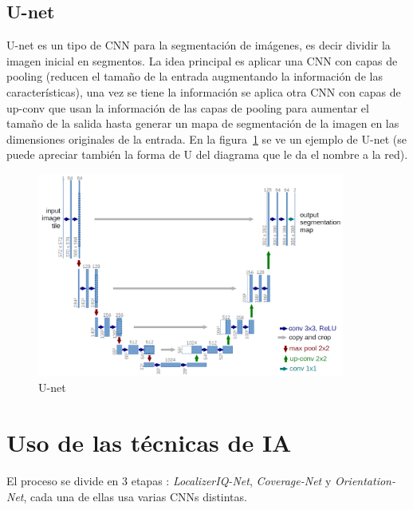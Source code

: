     
    \subsection{U-net}
    
    U-net es un tipo de CNN para la segmentación de imágenes, es decir dividir la imagen inicial en
    segmentos. La idea principal es aplicar una CNN con capas de pooling (reducen el tamaño de la entrada
    augmentando la información de las características), una vez se tiene la información se aplica otra
    CNN con capas de up-conv que usan la información de las capas de pooling para aumentar el tamaño
    de la salida hasta generar un mapa de segmentación de la imagen en las dimensiones originales de la
    entrada. En la figura~\ref{fig:unet} se ve un ejemplo de U-net (se puede apreciar también la forma de
    U del diagrama que le da el nombre a la red).
    
     \begin{figure}[H]
        \centering
        \includegraphics[width=0.9\textwidth]{unet}
        \caption{U-net}%
        \label{fig:unet}
     \end{figure}
     
\section{Uso de las técnicas de IA}
\cite{noauthor_intelligent_nodate}
\cite{noauthor_magnetic_nodate} 
\cite{noauthor_new_nodate}

El proceso se divide en 3 etapas \cite{noauthor_ge_nodate-1}:
\emph{LocalizerIQ-Net}, \emph{Coverage-Net} y \emph{Orientation-Net}, cada una de ellas usa varias 
CNNs distintas.

